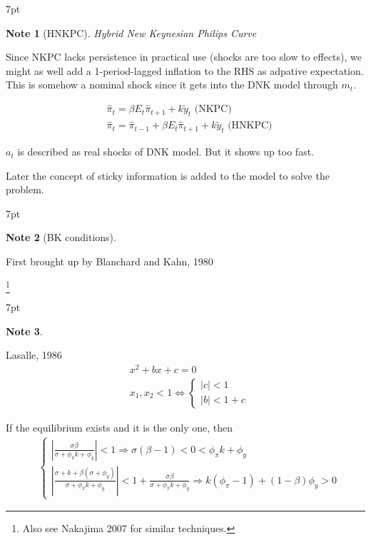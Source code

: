 \documentclass{article}
\newenvironment{blueblock}{
\def\FrameCommand{
  \hspace{1pt}
    {\color{DarkBlue}
    \vrule width 2pt}
    {\color{blueshade}
    \vrule width 4pt}
  \colorbox{blueshade}
}
\MakeFramed{
  \advance
  \hsize-
  \width
  \FrameRestore}
\noindent\hspace{-4.55pt}%
\begin{adjustwidth}{}{7pt}
\vspace{2pt}\vspace{2pt}
}
{\vspace{2pt}\end{adjustwidth}\endMakeFramed}
\newtheorem{note}{Note}
\begin{document}
\begin{blueblock}
\begin{note}[HNKPC]
Hybrid New Keynesian Philips Curve
\end{note}

Since NKPC lacks persistence in practical use (shocks are too slow to effects), we might as well add a 1-period-lagged inflation to the RHS as adpative expectation. This is somehow a nominal shock since it gets into the DNK model through $m_t$.

{\color{red}\begin{align}
&\hat \pi_t = \beta E_t \hat \pi_{t+1}+k \tilde y_t  \text{ (NKPC)}
\\&\hat \pi_t = \hat\pi_{t-1} + \beta E_t \hat \pi_{t+1}+k \tilde y_t  \text{ (HNKPC)}
\end{align}}

$a_t$ is described as real shocks of DNK model. But it shows up too fast.

Later the concept of sticky information is added to the model to solve the problem.

\end{blueblock}

\begin{blueblock}
\begin{note}[BK conditions]
\end{note}
First brought up by Blanchard and Kahn, 1980 
\end{blueblock}
\footnote{Also see Nakajima 2007 for similar techniques.}

\begin{blueblock}
\begin{note}
\end{note}
Lasalle, 1986
\begin{align}
& x^2 + b x +c=0
\\&x_{1},x_{2} <1 \iff 
\begin{cases}
  |c|<1\\|b|<1+c
\end{cases}
\end{align}
\end{blueblock}


If the equilibrium exists and it is the only one, then
\begin{align}
&\begin{cases}
  |\frac{\sigma \beta}{\sigma+\phi_\pi k +\phi_y}|<1 \Rightarrow \sigma(\beta-1)<0<\phi_\pi k +\phi_y
  \\
  |\frac{\sigma+k+\beta(\sigma+\phi_y)}{\sigma+\phi_\pi k +\phi_y}|<1+\frac{\sigma \beta}{\sigma+\phi_\pi k +\phi_y} \Rightarrow k(\phi_\pi-1)+(1-\beta)\phi_y>0
\end{cases}
\end{align}
\end{document}
